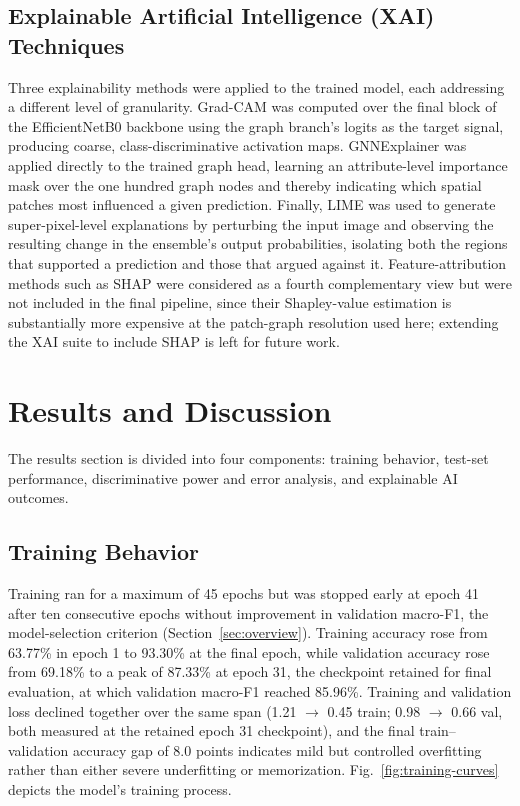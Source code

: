 \documentclass[conference]{IEEEtran}
\begin{document}
\subsection{Explainable Artificial Intelligence (XAI) Techniques}
\label{sec:xai}
Three explainability methods were applied to the trained model, each addressing a different level of granularity. Grad-CAM \cite{gradcam} was computed over the final block of the EfficientNetB0 backbone using the graph branch's logits as the target signal, producing coarse, class-discriminative activation maps. GNNExplainer \cite{ying2019gnnexplainer} was applied directly to the trained graph head, learning an attribute-level importance mask over the one hundred graph nodes and thereby indicating which spatial patches most influenced a given prediction. Finally, LIME \cite{lime} was used to generate super-pixel-level explanations by perturbing the input image and observing the resulting change in the ensemble's output probabilities, isolating both the regions that supported a prediction and those that argued against it. Feature-attribution methods such as SHAP \cite{lundberg2017unified} were considered as a fourth complementary view but were not included in the final pipeline, since their Shapley-value estimation is substantially more expensive at the patch-graph resolution used here; extending the XAI suite to include SHAP is left for future work.

\section{Results and Discussion}\label{results}
The results section is divided into four components: training behavior, test-set performance, discriminative power and error analysis, and explainable AI outcomes.

\subsection{Training Behavior}
Training ran for a maximum of 45 epochs but was stopped early at epoch 41 after ten consecutive epochs without improvement in validation macro-F1, the model-selection criterion (Section~\ref{sec:overview}). Training accuracy rose from 63.77\% in epoch 1 to 93.30\% at the final epoch, while validation accuracy rose from 69.18\% to a peak of 87.33\% at epoch 31, the checkpoint retained for final evaluation, at which validation macro-F1 reached 85.96\%. Training and validation loss declined together over the same span (1.21 $\rightarrow$ 0.45 train; 0.98 $\rightarrow$ 0.66 val, both measured at the retained epoch 31 checkpoint), and the final train--validation accuracy gap of 8.0 points indicates mild but controlled overfitting rather than either severe underfitting or memorization. Fig.~\ref{fig:training-curves} depicts the model's training process.
\end{document}
